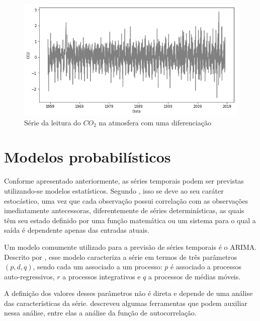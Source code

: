 \documentclass[
    12pt,
    oneside,
    a4paper,
    english,
    brazil
]{abntex2}
\begin{document}
\begin{figure}
    \centering
    \caption{Série da leitura do $CO_2$ na atmosfera com uma
        diferenciação}\label{fig:co2diff}
    \includegraphics[width=.6\linewidth]{images/co2_diff.png}
\end{figure}



\section{Modelos probabilísticos}

Conforme  apresentado anteriormente,  as séries  temporais podem  ser previstas
utilizando-se modelos  estatísticos. Segundo , isso  se deve
ao  seu caráter  estocástico, uma  vez  que cada  observação possui  correlação
com  as  observações  imediatamente   antecessoras,  diferentemente  de  séries
determinísticas, as quais têm seu estado  definido por uma função matemática ou
um sistema para o qual a saída é dependente apenas das entradas atuais.

Um modelo comumente utilizado para a  previsão de séries temporais é o ARIMA\@.
Descrito por  , esse  modelo caracteriza a  série em  termos de
três  parâmetros $(p,d,q)$,  sendo  cada  um associado  a  um  processo: $p$  é
associado a  processos auto-regressivos, $r$  a processos integrativos e  $q$ a
processos de médias móveis.

A  definição dos  valores  desses parâmetros  não  é direta  e  depende de  uma
análise  das  características  da  série.    descreveu  algumas
ferramentas que podem auxiliar nessa análise, entre elas a análise da função de
autocorrelação.
\end{document}
